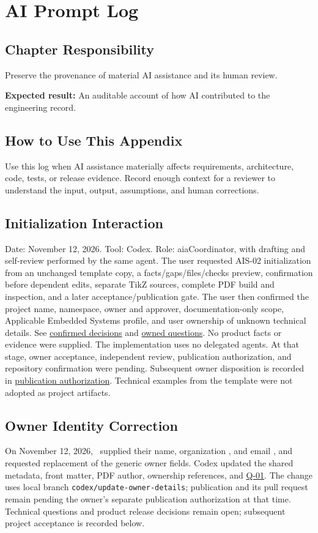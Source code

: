 \chapter{AI Prompt Log}
\section{Chapter Responsibility}
\label{Section:AIPromptLogResponsibility}
Preserve the provenance of material AI assistance and its human review.

\noindent\textbf{Expected result:} An auditable account of how AI contributed to the engineering record.

\section{How to Use This Appendix}
Use this log when AI assistance materially affects requirements, architecture, code, tests, or release evidence. Record enough context for a reviewer to understand the input, output, assumptions, and human corrections.
\section{Initialization Interaction}
\label{Section:InitializationInteraction}
Date: November 12, 2026. Tool: Codex. Role: aiaCoordinator, with drafting and
self-review performed by the same agent. The user requested AIS-02 initialization
from an unchanged template copy, a facts/gaps/files/checks preview, confirmation
before dependent edits, separate TikZ sources, complete PDF build and inspection,
and a later acceptance/publication gate. The user then confirmed the project
name, namespace, owner and approver, documentation-only scope, Applicable
Embedded Systems profile, and user ownership of unknown technical details.
See \hyperref[Section:ConfirmedProjectDecisions]{confirmed decisions} and
\hyperref[Section:OwnedQuestions]{owned questions}. No product facts or evidence
were supplied. The implementation uses no delegated agents. At that stage,
owner acceptance, independent review, publication authorization, and repository
confirmation were pending. Subsequent owner disposition is recorded in
\hyperref[Section:PublicationAuthorization]{publication authorization}. Technical examples from the template were not adopted as project artifacts.

\section{Owner Identity Correction}
\label{Section:OwnerIdentityCorrection}
On November 12, 2026, \DocumentOwner\ supplied their name, organization
\Organization, and email \href{mailto:\DocumentEmail}{\DocumentEmail}, and
requested replacement of the generic owner fields. Codex updated the shared
metadata, front matter, PDF author, ownership references, and
\hyperref[Question:Q-01]{Q-01}. The change uses local branch
\texttt{codex/update-owner-details}; publication and its pull request remain
pending the owner's separate publication authorization at that time. Technical
questions and product release decisions remain open; subsequent project
acceptance is recorded below.

